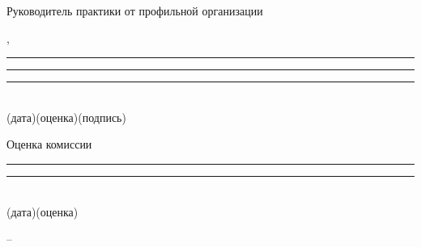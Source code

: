 \documentclass[12pt,a4paper]{extarticle}
\begin{document}
\ifhseHasCoSupervisor
\vspace{1.2em}
Руководитель практики от профильной организации

\smallskip
\hseCoSupervisorName, 

\vspace{0.7em}
\rule{2.6cm}{0.4pt}\quad\rule{3.2cm}{0.4pt}\quad\rule{4.2cm}{0.4pt}\\
{\scriptsize \hspace{0.4cm}(дата)\hspace{2.4cm}(оценка)\hspace{3.2cm}(подпись)}
\fi

\vspace{1.2em}
Оценка комиссии

\vspace{0.7em}
\rule{2.6cm}{0.4pt}\quad\rule{3.2cm}{0.4pt}\\
{\scriptsize \hspace{0.4cm}(дата)\hspace{2.4cm}(оценка)}

\vfill
\begin{center}
\hseCity{} -- \hseYear
\end{center}
\end{document}
